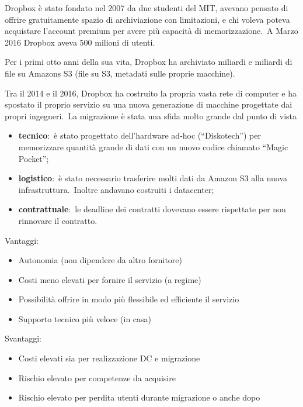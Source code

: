 Dropbox è stato fondato nel 2007 da due studenti del MIT, avevano pensato di offrire gratuitamente spazio di archiviazione con limitazioni, e chi voleva poteva acquistare l'account premium per avere più capacità di memorizzazione.\
A Marzo 2016 Dropbox aveva 500 milioni di utenti.\

Per i primi otto anni della sua vita, Dropbox ha archiviato miliardi e miliardi di file su Amazons S3 (file su S3, metadati sulle proprie macchine).\

Tra il 2014 e il 2016, Dropbox ha costruito la propria vasta rete di computer e ha spostato il proprio servizio su una nuova generazione di macchine progettate dai propri ingegneri.\
La migrazione è stata una sfida molto grande dal punto di vista
\begin{itemize}
    \item \textbf{tecnico}:\ è stato progettato dell'hardware ad-hoc (``Diskotech'') per memorizzare quantità grande di dati con un nuovo codice chiamato ``Magic Pocket'';
    \item \textbf{logistico}:\ è stato necessario trasferire molti dati da Amazon S3 alla nuova infrastruttura.\ Inoltre andavano costruiti i datacenter;
    \item \textbf{contrattuale}:\ le deadline dei contratti dovevano essere rispettate per non rinnovare il contratto.
\end{itemize}
Vantaggi:
\begin{itemize}
    \item Autonomia (non dipendere da altro fornitore)
    \item Costi meno elevati per fornire il servizio (a regime)
    \item Possibilità offrire in modo più flessibile ed efficiente il servizio
    \item Supporto tecnico più veloce (in casa)
\end{itemize}
Svantaggi:
\begin{itemize}
    \item Costi elevati sia per realizzazione DC e migrazione
    \item Rischio elevato per competenze da acquisire
    \item Rischio elevato per perdita utenti durante migrazione o anche dopo
\end{itemize}
